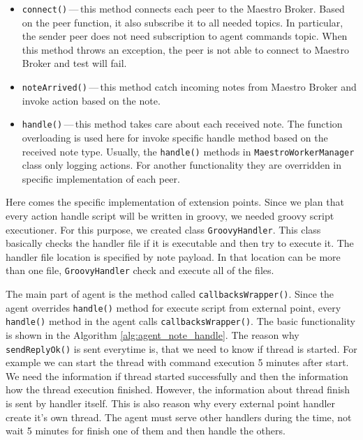 \begin{itemize}
	\setlength\itemsep{0em}
	\item \texttt{connect()}\,---\,this method connects each peer to the Maestro Broker. Based on the peer function, it also subscribe it to all needed topics. In particular, the sender peer does not need subscription to agent commands topic. When this method throws an exception, the peer is not able to connect to Maestro Broker and test will fail.
	\item \texttt{noteArrived()}\,---\,this method catch incoming notes from Maestro Broker and invoke action based on the note.
	\item \texttt{handle()}\,---\,this method takes care about each received note. The function overloading is used here for invoke specific handle method based on the received note type. Usually, the \texttt{handle()} methods in \texttt{MaestroWorkerManager} class only logging actions. For another functionality they are overridden in specific implementation of each peer.
\end{itemize}

Here comes the specific implementation of extension points. Since we plan that every action handle script will be written in groovy, we needed groovy script executioner. For this purpose, we created class \texttt{GroovyHandler}. This class basically checks the handler file if it is executable and then try to execute it. The handler file location is specified by note payload. In that location can be more than one file, \texttt{GroovyHandler} check and execute all of the files.

The main part of agent is the method called \texttt{callbacksWrapper()}. Since the agent overrides \texttt{handle()} method for execute script from external point, every \texttt{handle()} method in the agent calls \texttt{callbacksWrapper()}. The basic functionality is shown in the Algorithm \ref{alg:agent_note_handle}. The reason why \texttt{sendReplyOk()} is sent everytime is, that we need to know if thread is started. For example we can start the thread with command execution 5 minutes after start. We need the information if thread started successfully and then the information how the thread execution finished. However, the information about thread finish is sent by handler itself. This is also reason why every external point handler create it's own thread. The agent must serve other handlers during the time, not wait 5 minutes for finish one of them and then handle the others.

